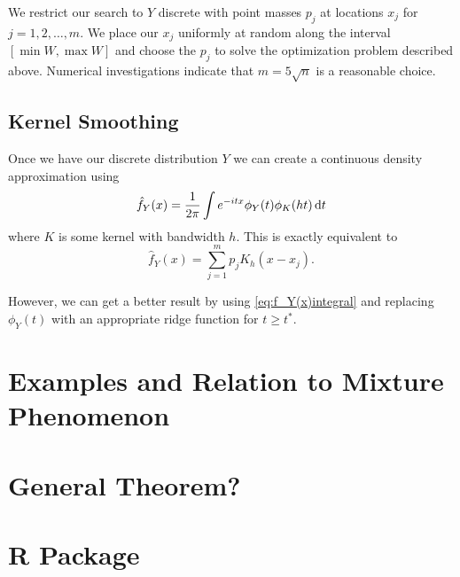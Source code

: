 		We restrict our search to $Y$ discrete with point masses $p_j$ at locations $x_j$ for $j = 1,2,\dots,m$. We place our $x_j$ uniformly at random along the interval $[\min W, \max W]$ and choose the $p_j$ to solve the optimization problem described above. Numerical investigations indicate that $m = 5 \sqrt{n}$ is a reasonable choice.

	\subsection{Kernel Smoothing}
		\label{ssec:KernelSmoothing}
		Once we have our discrete distribution $Y$ we can create a continuous density approximation using
		\begin{equation}
		\hat{f}_Y(x) = \frac{1}{2\pi} \int e^{-itx} \phi_Y(t) \phi_K(ht)  \, \mathrm{d} t
		\label{eq:f_Y(x)integral}
		\end{equation}
		where $K$ is some kernel with bandwidth $h$. This is exactly equivalent to
		\begin{equation}
		\hat{f}_Y(x) = \sum_{j=1}^m p_j K_h(x - x_j).
		\label{eq:f_Y(x)sum}
		\end{equation}

		However, we can get a better result by using \eqref{eq:f_Y(x)integral} and replacing $\phi_Y(t)$ with an appropriate ridge function for $t \geq t^*$.

\section{Examples and Relation to Mixture Phenomenon}

\section{General Theorem?}

\section{R Package}